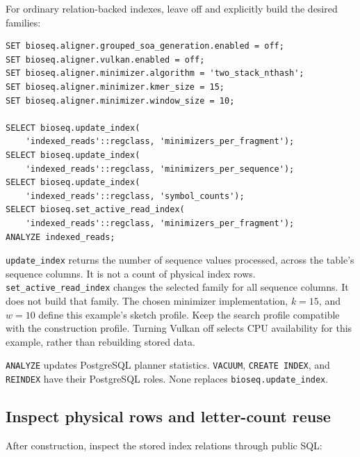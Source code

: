 For ordinary relation-backed indexes, leave
 off and explicitly
build the desired families:

\par\noindent\begin{minipage}{\linewidth}
\begin{lstlisting}[style=bioseq-appendix-sql,
  caption={Build all three ordinary families and select MPF for reads.},
  label={lst:appendix-ordinary-index-build}]
SET bioseq.aligner.grouped_soa_generation.enabled = off;
SET bioseq.aligner.vulkan.enabled = off;
SET bioseq.aligner.minimizer.algorithm = 'two_stack_nthash';
SET bioseq.aligner.minimizer.kmer_size = 15;
SET bioseq.aligner.minimizer.window_size = 10;

SELECT bioseq.update_index(
    'indexed_reads'::regclass, 'minimizers_per_fragment');
SELECT bioseq.update_index(
    'indexed_reads'::regclass, 'minimizers_per_sequence');
SELECT bioseq.update_index(
    'indexed_reads'::regclass, 'symbol_counts');
SELECT bioseq.set_active_read_index(
    'indexed_reads'::regclass, 'minimizers_per_fragment');
ANALYZE indexed_reads;
\end{lstlisting}
\end{minipage}

\texttt{update\_index} returns the number of sequence values processed,
across the table's sequence columns. It is not a count of physical index
rows. \texttt{set\_active\_read\_index} changes the selected family for
all sequence columns. It does not build that family.
The chosen minimizer implementation, $k=15$, and $w=10$ define this
example's sketch profile. Keep the search profile compatible with the
construction profile. Turning Vulkan off selects CPU availability for
this example, rather than rebuilding stored data.

\texttt{ANALYZE} updates PostgreSQL planner statistics.
\texttt{VACUUM}, \texttt{CREATE INDEX}, and \texttt{REINDEX} have their
PostgreSQL roles. None replaces \texttt{bioseq.update\_index}.

\subsection{Inspect physical rows and letter-count reuse}

After construction, inspect the stored index relations through public SQL:

